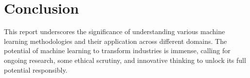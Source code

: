 \documentclass[11pt, a4paper]{article}
\begin{document}
\section{Conclusion}
This report underscores the significance of understanding various machine learning methodologies and their application across different domains. The potential of machine learning to transform industries is immense, calling for ongoing research, some ethical scrutiny, and innovative thinking to unlock its full potential responsibly.
\end{document}
